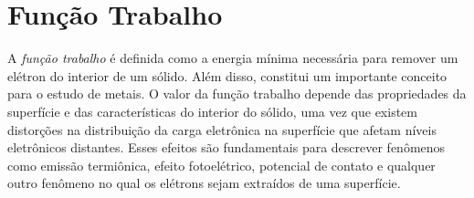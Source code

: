 \section{Função Trabalho\label{work}}
A \textit{função trabalho} é definida como a energia mínima necessária para remover um elétron do interior de um sólido. Além disso, constitui um importante conceito para o estudo de metais. O valor da função trabalho depende das propriedades da superfície e das características do interior do sólido, uma vez que existem distorções na distribuição da carga eletrônica na superfície que afetam níveis eletrônicos distantes. Esses efeitos são fundamentais para descrever fenômenos como emissão termiônica, efeito fotoelétrico, potencial de contato e qualquer outro fenômeno no qual os elétrons sejam extraídos de uma superfície.  

